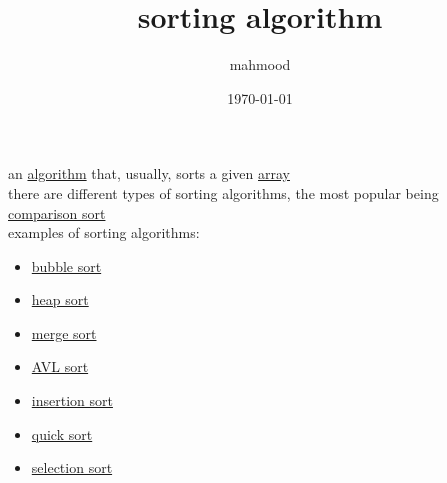 \documentclass[a4paper,12pt]{article}
\author{mahmood}
\date{\today}
\title{sorting algorithm}
\begin{document}
\maketitle
an \href{20220706211958-algorithm.org}{algorithm} that, usually, sorts a given \href{20220728190531-array.org}{array}\\
there are different types of sorting algorithms, the most popular being \href{20230204143356-comparison_sort.org}{comparison sort}\\
examples of sorting algorithms:\\
\begin{itemize}
\item \href{20230204143813-bubble_sort.org}{bubble sort}\\
\item \href{20230204143915-heap_sort.org}{heap sort}\\
\item \href{20230204143850-merge_sort.org}{merge sort}\\
\item \href{20230204143714-avl_sort.org}{AVL sort}\\
\item \href{20230204143636-insertion_sort.org}{insertion sort}\\
\item \href{20230202201423-quick_sort.org}{quick sort}\\
\item \href{20230204143447-selection_sort.org}{selection sort}
\end{itemize}
\end{document}
